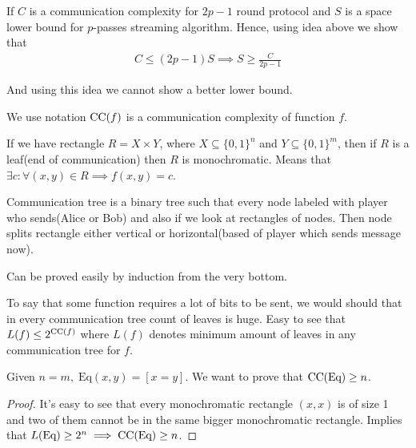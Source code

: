 \begin{claim}
	If $C$ is a communication complexity for $2p - 1$ round protocol and $S$ is a space lower bound for $p$-passes streaming algorithm. Hence, using idea above we show that
	\begin{align*}
		C \leq (2p - 1) S \implies S \geq \frac C {2p - 1}
	\end{align*}
	
	And using this idea we cannot show a better lower bound.
\end{claim}

\begin{prop}
	We use notation $\operatorname{CC}(f)$ is a communication complexity of function $f$. 
\end{prop}

\begin{remrk}
	If we have rectangle $R = X \times Y$, where $X \subseteq \{0, 1\}^n$ and $Y \subseteq \{0, 1\}^m$, then if $R$ is a leaf(end of communication) then $R$ is monochromatic. Means that $\exists c \colon \forall (x, y) \in R \implies f(x, y) = c$.
\end{remrk}

\begin{remrk}
	Communication tree is a binary tree such that every node labeled with player who sends(Alice or Bob) and also if we look at rectangles of nodes. Then node splits rectangle either vertical or horizontal(based of player which sends message now).
	
	Can be proved easily by induction from the very bottom.
\end{remrk}


\begin{remrk}
To say that some function requires a lot of bits to be sent, we would should that in every communication tree count of leaves is huge. 
Easy to see that $L(f) \leq 2^{\operatorname{CC}(f)}$ where $L(f)$ denotes minimum amount of leaves in any communication tree for $f$. 
	
\end{remrk}

\begin{thm}
	Given $n = m, \; \text{Eq}(x, y) = [x = y]$. We want to prove that $\operatorname{CC}(\text{Eq}) \geq n$.
\end{thm}

\begin{proof}
	It's easy to see that every monochromatic rectangle $(x, x)$ is of size 1 and two of them cannot be in the same bigger monochromatic rectangle. 
	Implies that $L(\text{Eq}) \geq 2^n \implies \operatorname{CC}(\text{Eq}) \geq n$.	
\end{proof}


